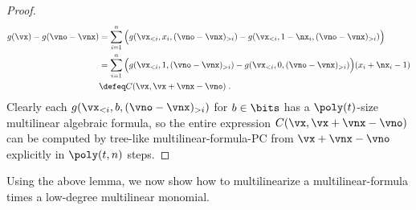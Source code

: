\documentclass[11pt]{article}
\numberwithin{equation}{section}
\theoremstyle{definition}
\theoremstyle{plain}
\begin{document}
\begin{proof}
        \begin{align*}
                g(\vx)-g(\vno-\vnx)
                &=\sum_{i=1}^n \Big (g(\vx_{<i},x_i,(\vno-\vnx)_{>i}) - g(\vx_{<i},1-\nx_i,(\vno-\vnx)_{> i})\Big)\\
                &=\sum_{i=1}^n \Big(g(\vx_{<i},1,(\vno-\vnx)_{>i})-g(\vx_{<i},0,(\vno-\vnx)_{>i})\Big)(x_i+\nx_i-1)\\
                &\defeq C(\vx,\vx+\vnx-\vno)
                \;.
        \end{align*}
        Clearly each $g(\vx_{<i},b,(\vno-\vnx)_{>i})$ for $b\in\bits$ has a $\poly(t)$-size multilinear algebraic formula, so the entire expression $C(\vx,\vx+\vnx-\vno)$ can be computed by tree-like multilinear-formula-PC from $\vx+\vnx-\vno$ explicitly in $\poly(t,n)$ steps.
\end{proof}

Using the above lemma, we now show how to multilinearize a multilinear-formula times a low-degree multilinear monomial.
\end{document}
